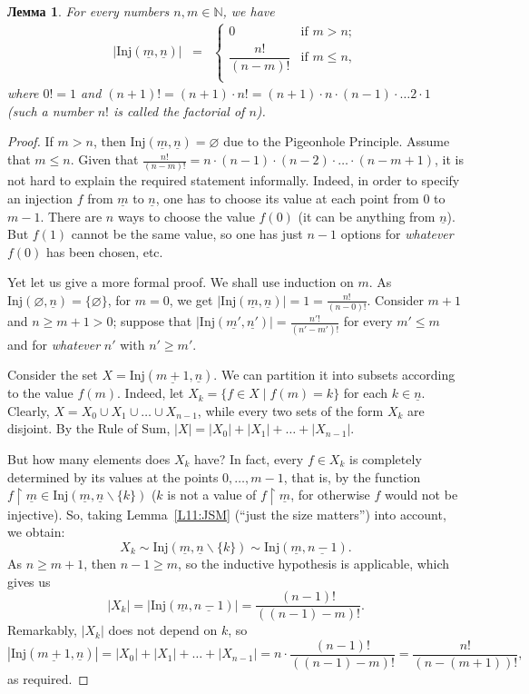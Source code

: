 \documentclass[12pt,notitlepage]{article}
\theoremstyle{plain}
\newtheorem{lemma}[thm]{Лемма}
\theoremstyle{definition}
\theoremstyle{plain}
\newcommand{\N}{\mathbb{N}}
\renewcommand{\setminus}{\smallsetminus}
\newcommand{\void}{\varnothing}
\newcommand{\rst}{\mathop{\upharpoonright}}
\newcommand{\ul}[1]{\underline{#1}}
\newcommand{\1}{\mathbf{1}}
\newcommand{\0}{\mathbf{0}}
\begin{document}
\begin{lemma}\label{L11:num_inj}
	For every numbers $n, m \in \N$, we have
	$$
	\begin{array}{rcll}
		|\mathrm{Inj}(\ul{m},\ul{n})| &=& \begin{cases}
			0&\mbox{if } m > n;\\
			\dfrac{n!}{(n-m)!}&\mbox{if } m \leq n,\\
		\end{cases}
	\end{array}
	$$
	where $0! = 1$ and $(n + 1)! = (n + 1)\cdot n! = (n+1)\cdot n \cdot (n - 1) \cdot \ldots 2 \cdot 1$ (such a number $n!$ is called the \emph{factorial} of $n$).
\end{lemma}
\begin{proof}
	If $m > n$, then $\mathrm{Inj}(\ul{m},\ul{n}) = \void$ due to the Pigeonhole Principle. Assume that $m \leq n$. Given that $\frac{n!}{(n-m)!} = n\cdot (n - 1) \cdot (n - 2) \cdot \ldots \cdot (n - m + 1)$, it is not hard to explain the required statement informally. Indeed, in order to specify an injection $f$ from $\ul{m}$ to $\ul{n}$, one has to choose its value at each point from $0$ to $m - 1$. There are $n$ ways to choose the value $f(0)$ (it can be anything from $\ul{n}$). But $f(1)$ cannot be the same value, so one has just $n - 1$ options for \emph{whatever} $f(0)$ has been chosen, etc.
	
	Yet let us give a more formal proof. We shall use induction on $m$. As $\mathrm{Inj}(\void,\ul{n}) = \{ \void \}$, for $m = 0$, we get $|\mathrm{Inj}(\ul{m},\ul{n})| = 1 = \frac{n!}{(n - 0)!}$. Consider $m + 1$ and $n \geq m + 1 > 0$; suppose that $|\mathrm{Inj}(\ul{m'},\ul{n'})| = \frac{n'!}{(n'-m')!}$ for every $m' \leq m$ and for \emph{whatever} $n'$ with $n' \geq m'$.
	
	Consider the set $X = \mathrm{Inj}(\ul{m+1},\ul{n})$. We can partition it into subsets according to the value $f(m)$. Indeed, let $X_k = \{ f\in X \mid f(m) = k \}$ for each $k \in \ul{n}$. Clearly, $X = X_0 \cup X_1 \cup \ldots \cup X_{n-1}$, while every two sets of the form $X_k$ are disjoint. By the Rule of Sum, $|X| = |X_0| + |X_1| + \ldots + |X_{n-1}|$.
	
	But how many elements does $X_k$ have? In fact, every $f \in X_k$ is completely determined by its values at the points $0,\ldots,m-1$, that is, by the function $f \rst \ul{m} \in \mathrm{Inj}(\ul{m}, \ul{n} \setminus \{k\})$ ($k$ is not a value of $f\rst \ul{m}$, for otherwise $f$ would not be injective). So, taking Lemma~\ref{L11:JSM} (``just the size matters'') into account, we obtain:
	$$X_k \sim \mathrm{Inj}(\ul{m}, \ul{n} \setminus \{k\}) \sim \mathrm{Inj}(\ul{m}, \ul{n - 1}).$$
	As $n \geq m + 1$, then $n - 1 \geq m$, so the inductive hypothesis is applicable, which gives us
	$$|X_k| = |\mathrm{Inj}(\ul{m}, \ul{n - 1})| = \dfrac{(n-1)!}{((n-1) - m)!}.$$
	Remarkably, $|X_k|$ does not depend on $k$, so
	$$|\mathrm{Inj}(\ul{m+1},\ul{n})| = |X_0| + |X_1| + \ldots + |X_{n-1}| = n \cdot \dfrac{(n-1)!}{((n-1) - m)!} = \dfrac{n!}{(n- (m + 1))!},$$
	as required.
\end{proof}
\end{document}
